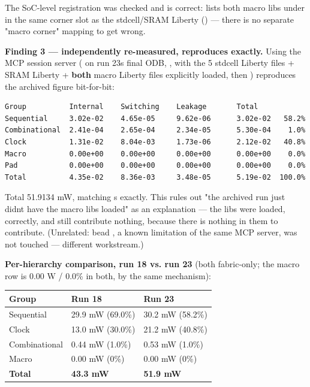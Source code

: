 \begin{record}
The SoC-level registration was checked and is correct:
 lists both macro libs under
 in the same  corner slot as the
stdcell/\allowbreak{}SRAM Liberty () --- there
is no separate "macro corner" mapping to get wrong.

\textbf{Finding 3 --- independently re-measured, reproduces exactly.}
Using the  MCP session server ( on run
23\textquotesingle s final ODB,
,
with the 5 stdcell Liberty files + SRAM Liberty + \textbf{both} macro
Liberty files explicitly loaded, then ) reproduces the
archived figure bit-for-bit:

\begin{lstlisting}[language={}]
Group          Internal    Switching    Leakage       Total
Sequential     3.02e-02    4.65e-05     9.62e-06      3.02e-02   58.2%
Combinational  2.41e-04    2.65e-04     2.34e-05      5.30e-04    1.0%
Clock          1.31e-02    8.04e-03     1.73e-06      2.12e-02   40.8%
Macro          0.00e+00    0.00e+00     0.00e+00      0.00e+00    0.0%
Pad            0.00e+00    0.00e+00     0.00e+00      0.00e+00    0.0%
Total          4.35e-02    8.36e-03     3.48e-05      5.19e-02  100.0%
\end{lstlisting}

Total 51.9134 mW, matching \textquotesingle s
 exactly. This rules out "the archived run just
didn\textquotesingle t have the macro libs loaded" as an explanation ---
the libs were loaded, correctly, and still contribute nothing, because
there is nothing in them to contribute. (Unrelated: bead , a
known  limitation of the same MCP server, was not touched
--- different workstream.)

\textbf{Per-hierarchy comparison, run 18 vs. run 23} (both fabric-only;
the macro row is 0.00 W / 0.0\% in both, by the same mechanism):

{
\begin{longtable}[]{@{}lll@{}}
\toprule\noalign{}
Group & Run 18 & Run 23 \\
\midrule\noalign{}
\endhead
\bottomrule\noalign{}
\endlastfoot
Sequential & 29.9 mW (69.0\%) & 30.2 mW (58.2\%) \\
Clock & 13.0 mW (30.0\%) & 21.2 mW (40.8\%) \\
Combinational & 0.44 mW (1.0\%) & 0.53 mW (1.0\%) \\
Macro & 0.00 mW (0\%) & 0.00 mW (0\%) \\
\textbf{Total} & \textbf{43.3 mW} & \textbf{51.9 mW} \\
\end{longtable}
}


\end{record}
